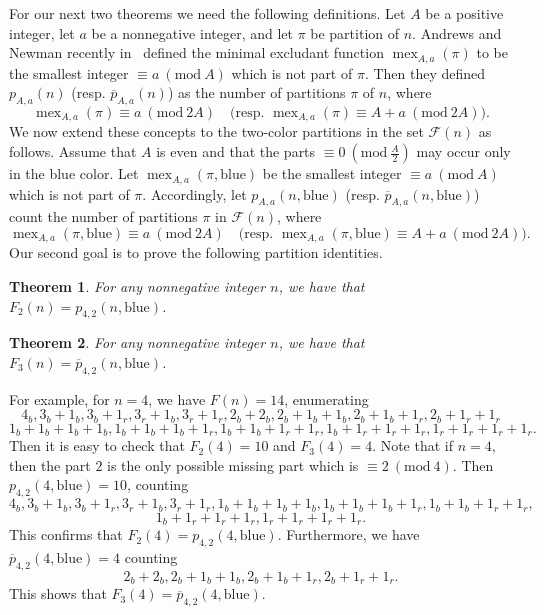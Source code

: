 \documentclass{amsart}
\numberwithin{equation}{section}
\newtheorem{theorem}{Theorem}
\theoremstyle{definition}
\newcommand{\Mod}[1]{\ (\mathrm{mod}\ #1)}
\newcommand{\fr}{\frac}
\DeclareMathOperator{\mex}{mex}
\begin{document}
For our next two theorems we need the following definitions.
Let $A$ be a positive integer, let $a$ be a nonnegative integer, and let $\pi$ be partition of $n$.
Andrews and Newman recently in~\cite{Andrews-Newman 2020} defined the minimal excludant function $\mex_{A,a}(\pi)$
to be the smallest integer $\equiv a\Mod{A}$ which is not part of $\pi$. Then they defined $p_{A,a}(n)$ (resp. $\overline{p}_{A,a}(n)$)
as the number of partitions $\pi$ of $n$, where
\[ \mex_{A,a}(\pi)\equiv a\Mod{2A}\quad \text{(resp. $\mex_{A,a}(\pi)\equiv A+a\Mod{2A}$)}.
\]
We now extend these concepts to the two-color partitions in the set $\mathcal{F}(n)$ as follows.
Assume that $A$ is even and that the parts $\equiv 0\Mod{\fr{A}{2}}$ may occur only in the blue color.
Let $\mex_{A,a}(\pi, \text{blue})$
be the smallest integer $\equiv a\Mod{A}$ which is not part of $\pi$. Accordingly, let
$p_{A,a}(n, \text{blue})$ (resp. $\overline{p}_{A,a}(n, \text{blue})$)
count the number of partitions $\pi$ in $\mathcal{F}(n)$, where
\[ \mex_{A,a}(\pi, \text{blue})\equiv a\Mod{2A}\quad \text{(resp. $\mex_{A,a}(\pi, \text{blue})\equiv A+a\Mod{2A}$)}.
\]
Our second goal is to prove the following partition identities.
\begin{theorem}\label{thm mainF2}
For any nonnegative integer $n$, we have that $F_2(n)=p_{4,2}(n, \text{blue})$.
\end{theorem}
%
\begin{theorem}\label{thm mainF3}
For any nonnegative integer $n$, we have that $F_3(n)=\overline{p}_{4,2}(n, \text{blue})$.
\end{theorem}
%
For example, for $n=4$, we have $F(n)= 14$, enumerating
\[
4_b, 3_b+1_b, 3_b+1_r, 3_r+1_b, 3_r+1_r, 2_b+2_b, 2_b+1_b+1_b, 2_b+1_b+1_r, 2_b+1_r+1_r
\]
\[
1_b+1_b+1_b+1_b, 1_b+1_b+1_b+1_r, 1_b+1_b+1_r+1_r, 1_b+1_r+1_r+1_r, 1_r+1_r+1_r+1_r.
\]
Then it is easy to check that $F_2(4)=10$ and $F_3(4)=4$. Note that if $n=4$, then the part $2$ is
the only possible missing part which is $\equiv 2\Mod{4}$.
Then $p_{4,2}(4, \text{blue})=10$, counting
\[
4_b, 3_b+1_b, 3_b+1_r, 3_r+1_b, 3_r+1_r, 1_b+1_b+1_b+1_b, 1_b+1_b+1_b+1_r, 1_b+1_b+1_r+1_r,
\]
\[
1_b+1_r+1_r+1_r, 1_r+1_r+1_r+1_r.
\]
This confirms that $F_2(4)=p_{4,2}(4, \text{blue})$.
Furthermore, we have $\overline{p}_{4,2}(4, \text{blue})=4$ counting
\[
2_b+2_b, 2_b+1_b+1_b, 2_b+1_b+1_r, 2_b+1_r+1_r.
\]
This shows that $F_3(4)=\overline{p}_{4,2}(4, \text{blue})$.
%
\end{document}
